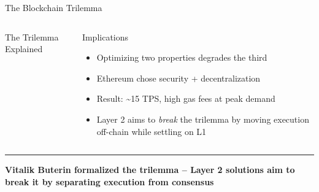 \documentclass[8pt,aspectratio=169]{beamer}
\newcommand{\bottomnote}[1]{\vfill\vspace{-2mm}\textcolor{mllavender2}{\rule{\textwidth}{0.4pt}}\vspace{1mm}\footnotesize\textbf{#1}}
\begin{document}
\begin{frame}{The Blockchain Trilemma}
\begin{columns}[T]
\begin{block}{The Trilemma Explained}
\begin{itemize}
\end{itemize}
\end{block}
\vspace{2mm}
\begin{block}{Implications}
\footnotesize
\begin{itemize}
  \item Optimizing two properties degrades the third
  \item Ethereum chose security + decentralization
  \item Result: \textasciitilde15 TPS, high gas fees at peak demand
  \item Layer 2 aims to \textit{break} the trilemma by moving execution off-chain while settling on L1
\end{itemize}
\end{block}
\end{columns}
\bottomnote{Vitalik Buterin formalized the trilemma -- Layer 2 solutions aim to break it by separating execution from consensus}
\end{frame}
\end{document}

